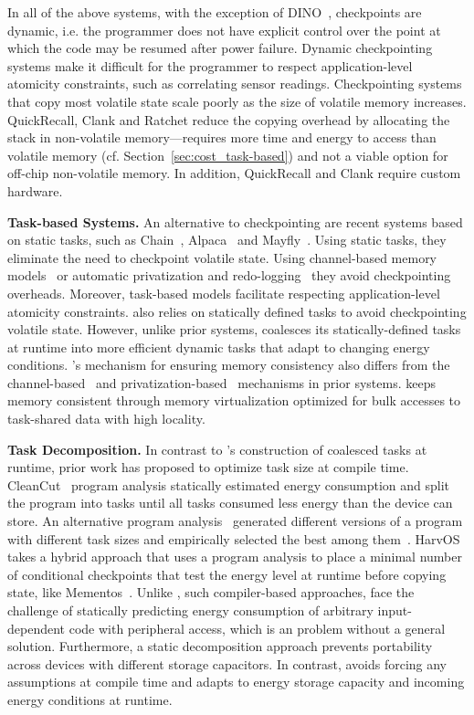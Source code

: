 In all of the above systems, with the exception of DINO~\cite{dino}, checkpoints are dynamic, i.e. the programmer does not have explicit control over the point at which the code may be resumed after power failure. Dynamic checkpointing systems make it difficult for the programmer to respect application-level atomicity constraints, such as correlating sensor readings. Checkpointing systems that copy most volatile state scale poorly as the size of volatile memory increases.  QuickRecall, Clank and Ratchet reduce the copying overhead by allocating the stack in non-volatile memory---requires more time and energy to access than volatile memory (cf. Section~\ref{sec:cost_task-based}) and not a viable option for off-chip non-volatile memory. In addition, QuickRecall and Clank require custom hardware. 

\textbf{Task-based Systems.} An alternative to checkpointing are recent systems based on static tasks, such as Chain~\cite{chain}, Alpaca~\cite{alpaca} and Mayfly~\cite{hester_sensys_2017}. Using static tasks, they eliminate the need to checkpoint volatile state. Using channel-based memory models~\cite{chain,hester_sensys_2017} or automatic privatization and redo-logging~\cite{alpaca} they avoid checkpointing overheads. Moreover, task-based models facilitate respecting application-level atomicity constraints. \sys also relies on
statically defined tasks to avoid checkpointing volatile state. However, unlike prior systems, \sys coalesces its statically-defined tasks at runtime into more efficient dynamic tasks that adapt to changing energy conditions. \sys's mechanism for ensuring memory consistency also differs from the channel-based~\cite{chain} and privatization-based~\cite{alpaca} mechanisms in prior systems. \sys keeps memory consistent through memory virtualization optimized for bulk accesses to task-shared data with high locality.

\textbf{Task Decomposition.} In contrast to \sys's construction of coalesced tasks at runtime, prior work has proposed to optimize task size at compile time. CleanCut~\cite{cleancut_2018} program analysis statically estimated energy consumption and split the program into tasks until all tasks consumed less energy than the device can store. An alternative program analysis~\cite{baghsorkhi_cgo_2018} generated different versions of a program with different task sizes and empirically selected the best among them~\cite{baghsorkhi_cgo_2018}. HarvOS~\cite{mottola2017harvos} takes a hybrid approach that uses a program analysis to place a minimal number of conditional checkpoints that test the energy level at runtime before copying state, like Mementos~\cite{mementos}. Unlike \sys, such compiler-based approaches, face the challenge of statically predicting energy consumption of arbitrary input-dependent code with peripheral access, which is an problem without a general solution. Furthermore, a static decomposition approach prevents portability across devices with different storage capacitors. In contrast, \sys avoids forcing any assumptions at compile time and adapts to energy storage capacity and incoming energy conditions at runtime.

